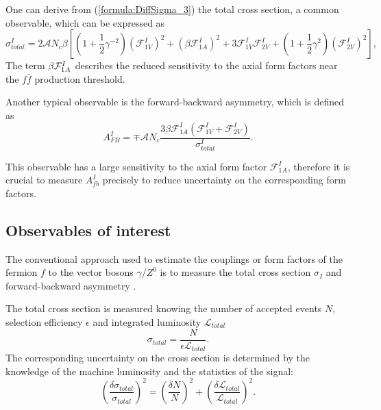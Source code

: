 One can derive from (\ref{formula:DiffSigma_3}) the total cross section, a common observable, which can be expressed as
\begin{equation}
\label{formula:TotalSigma_3}
\sigma^I_{total} = 2\mathcal{A}N_c\beta[(1+\frac{1}{2}\gamma^{-2})(\mathcal{F}^I_{1V})^2 + (\beta\mathcal{F}^I_{1A})^2+3\mathcal{F}^I_{1V}\mathcal{F}^I_{2V}+(1+\frac{1}{2}\gamma^{2})(\mathcal{F}^I_{2V})^2],
\end{equation}
The term $\beta \mathcal{F}^I_{1A}$ describes the reduced sensitivity to the axial form factors near the $f\bar{f}$ production threshold. 


Another typical observable is the forward-backward asymmetry, which is defined as
\begin{equation}
A_{FB}^I = \mp \mathcal{A} N_c \frac{3\beta\mathcal{F}^I_{1A}(\mathcal{F}^I_{1V} + \mathcal{F}^I_{2V})}{\sigma^I_{total}}.
\label{formula:AfbForm_3}
\end{equation}

This observable has a large sensitivity to the axial form factor $\mathcal{F}^I_{1A}$, therefore it is crucial to measure $A_{fb}^I$ precisely to reduce uncertainty on the corresponding form factors.
\subsection{Observables of interest}
The conventional approach used to estimate the couplings or form factors of the fermion $f$ to the vector bosons $\gamma /Z^0$ is to measure the total cross section $\sigma_I$ and forward-backward asymmetry \afb.

The total cross section is measured knowing the number of accepted events $N$, selection efficiency $\epsilon$ and integrated luminosity $\mathcal{L}_{total}$
\begin{equation}
\sigma_{total} = \frac{N}{\epsilon \mathcal{L}_{total}}.
\label{formula:Xsection_3}
\end{equation}
The corresponding uncertainty on the cross section is determined by the knowledge of the machine luminosity and the statistics of the signal: 
\begin{equation}
	(\frac{\delta \sigma_{total}}{\sigma_{total}})^2 = (\frac{\delta N}{N})^2 + (\frac{\delta \mathcal{L}_{total}}{\mathcal{L}_{total}})^2.
\end{equation}

